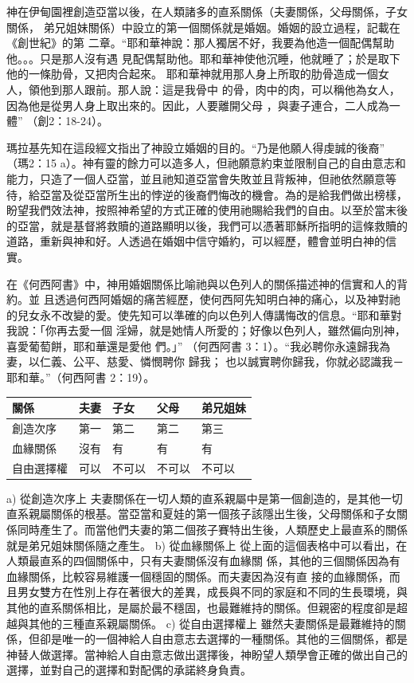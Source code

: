 神在伊甸園裡創造亞當以後，在人類諸多的直系關係（夫妻關係，父母關係，子女關係，
弟兄姐妹關係）中設立的第一個關係就是婚姻。婚姻的設立過程，記載在《創世紀》的第
二章。“耶和華神說：那人獨居不好，我要為他造一個配偶幫助他。。。只是那人沒有遇
見配偶幫助他。耶和華神使他沉睡，他就睡了；於是取下他的一條肋骨，又把肉合起來。
耶和華神就用那人身上所取的肋骨造成一個女人，領他到那人跟前。那人說：這是我骨中
的骨，肉中的肉，可以稱他為女人，因為他是從男人身上取出來的。因此，人要離開父母
，與妻子連合，二人成為一體” （創2：18-24）。



瑪拉基先知在這段經文指出了神設立婚姻的目的。“乃是他願人得虔誠的後裔” （瑪2：15
a）。神有靈的餘力可以造多人，但祂願意約束並限制自己的自由意志和能力，只造了一個人亞當，並且祂知道亞當會失敗並且背叛神，但祂依然願意等待，給亞當及從亞當所生出的悖逆的後裔們悔改的機會。為的是給我們做出榜樣，盼望我們效法神，按照神希望的方式正確的使用祂賜給我們的自由。以至於當末後的亞當，就是基督將救贖的道路顯明以後，我們可以憑著耶穌所指明的這條救贖的道路，重新與神和好。人透過在婚姻中信守婚約，可以經歷，體會並明白神的信實。

在《何西阿書》中，神用婚姻關係比喻祂與以色列人的關係描述神的信實和人的背約。並
且透過何西阿婚姻的痛苦經歷，使何西阿先知明白神的痛心，以及神對祂的兒女永不改變的愛。使先知可以準確的向以色列人傳講悔改的信息。“耶和華對我說：「你再去愛一個
淫婦，就是她情人所愛的；好像以色列人，雖然偏向別神，喜愛葡萄餅，耶和華還是愛他
們。」” （何西阿書 3：1）。“我必聘你永遠歸我為妻，以仁義、公平、慈愛、憐憫聘你
歸我； 也以誠實聘你歸我，你就必認識我－耶和華。”（何西阿書 2：19）。



\begin{table}[H]
\centering
\begin{tabular}{p{6em}|p{4em}|p{4em}|p{4em}|p{4em}}  \toprule
 關係 & 夫妻 &子女& 父母& 弟兄姐妹\\  \midrule
創造次序&第一& 第二& 第二 &第三\\  \midrule
血緣關係&沒有 &有& 有& 有\\  \midrule
自由選擇權& 可以& 不可以 &不可以 &不可以\\  \midrule
\end{tabular}
\end{table}

a) 從創造次序上
夫妻關係在一切人類的直系親屬中是第一個創造的，是其他一切直系親屬關係的根基。當亞當和夏娃的第一個孩子該隱出生後，父母關係和子女關係同時產生了。而當他們夫妻的第二個孩子賽特出生後，人類歷史上最直系的關係就是弟兄姐妹關係隨之產生。
b) 從血緣關係上
從上面的這個表格中可以看出，在人類最直系的四個關係中，只有夫妻關係沒有血緣關
係，其他的三個關係因為有血緣關係，比較容易維護一個穩固的關係。而夫妻因為沒有直
接的血緣關係，而且男女雙方在性別上存在著很大的差異，成長與不同的家庭和不同的生長環境，與其他的直系關係相比，是屬於最不穩固，也最難維持的關係。但親密的程度卻是超越與其他的三種直系親屬關係。
c) 從自由選擇權上
雖然夫妻關係是最難維持的關係，但卻是唯一的一個神給人自由意志去選擇的一種關係。其他的三個關係，都是神替人做選擇。當神給人自由意志做出選擇後，神盼望人類學會正確的做出自己的選擇，並對自己的選擇和對配偶的承諾終身負責。

